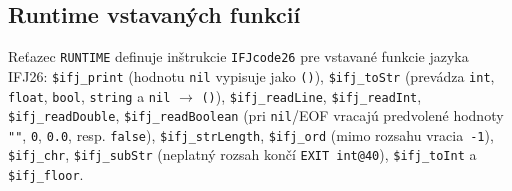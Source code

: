 \subsection{Runtime vstavaných funkcií}
Reťazec \texttt{RUNTIME} definuje inštrukcie \texttt{IFJcode26} pre vstavané funkcie jazyka IFJ26: \texttt{\$ifj\_print} (hodnotu \texttt{nil} vypisuje jako \texttt{()}), \texttt{\$ifj\_toStr} (prevádza \texttt{int}, \texttt{float}, \texttt{bool}, \texttt{string} a \texttt{nil} $\rightarrow$ \texttt{()}), \texttt{\$ifj\_readLine}, \texttt{\$ifj\_readInt}, \texttt{\$ifj\_readDouble}, \texttt{\$ifj\_readBoolean} (pri \texttt{nil}/EOF vracajú predvolené hodnoty \texttt{""}, \texttt{0}, \texttt{0.0}, resp. \texttt{false}), \texttt{\$ifj\_strLength}, \texttt{\$ifj\_ord} (mimo rozsahu vracia~\texttt{-1}), \texttt{\$ifj\_chr}, \texttt{\$ifj\_subStr} (neplatný rozsah končí \texttt{EXIT int@40}), \texttt{\$ifj\_toInt} a \texttt{\$ifj\_floor}.
